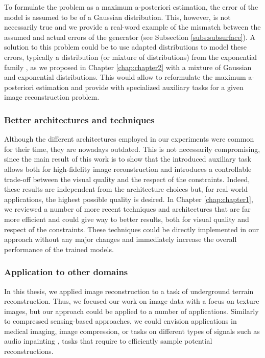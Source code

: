 To formulate the problem as a maximum a-posteriori estimation, the error of the model is assumed to be of a Gaussian distribution. This, however, is not necessarily true and we provide a real-word example of the mismatch between the assumed and actual errors of the generator (see Subsection \ref{subs:subsurface}). A solution to this problem could be to use adapted distributions to model these errors, typically a distribution (or mixture of distributions) from the exponential family \citep{Brown1986}, as we proposed in Chapter \ref{chap:chapter2} with a mixture of Gaussian and exponential distributions. This would allow to reformulate the maximum a-posteriori estimation and provide with specialized auxiliary tasks for a given image reconstruction problem.

\subsubsection*{Better architectures and techniques}

Although the different architectures employed in our experiments were common for their time, they are nowadays outdated. This is not necessarily compromising, since the main result of this work is to show that the introduced auxiliary task allows both for high-fidelity image reconstruction and introduces a controllable trade-off between the visual quality and the respect of the constraints. Indeed, these results are independent from the architecture choices but, for real-world applications, the highest possible quality is desired. In Chapter \ref{chap:chapter1}, we reviewed a number of more recent techniques and architectures that are far more efficient and could give way to better results, both for visual quality and respect of the constraints. These techniques could be directly implemented in our approach without any major changes and immediately increase the overall performance of the trained models.

\subsubsection*{Application to other domains}

In this thesis, we applied image reconstruction to a task of underground terrain reconstruction. Thus, we focused our work on image data with a focus on texture images, but our approach could be applied to a number of applications. Similarly to compressed sensing-based approaches, we could envision applications in medical imaging, image compression, or tasks on different types of signals such as audio inpainting \citep{Marafioti2018}, tasks that require to efficiently sample potential reconstructions.

